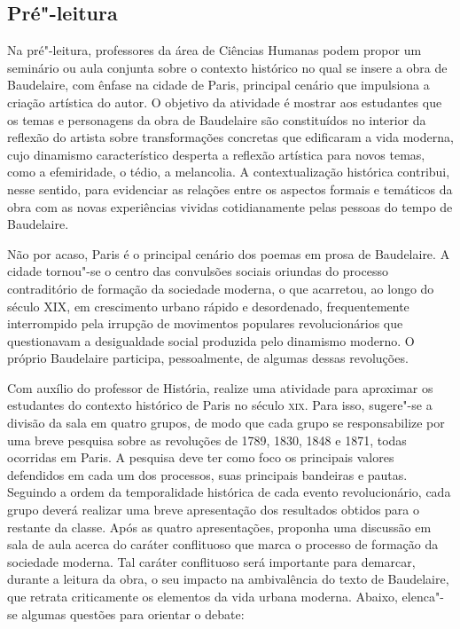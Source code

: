 \documentclass[12pt]{extarticle}
\begin{document}
\subsection{Pré"-leitura}

Na pré"-leitura, professores da área de Ciências Humanas
podem propor um seminário ou aula conjunta sobre o contexto histórico no qual se insere
a obra de Baudelaire, com ênfase na cidade de Paris, principal cenário que impulsiona a criação artística do autor. 
O objetivo da atividade é mostrar aos estudantes que os temas e personagens da obra de Baudelaire são constituídos no interior da reflexão do artista sobre transformações concretas que edificaram a vida moderna, cujo dinamismo característico desperta a reflexão artística para novos temas, como a efemiridade, o tédio, a melancolia. A contextualização histórica contribui, nesse sentido, para evidenciar as relações entre os aspectos formais e temáticos da obra com as novas experiências vividas cotidianamente pelas pessoas do tempo de Baudelaire.

Não por acaso, Paris é o principal cenário dos poemas em prosa de Baudelaire. A cidade tornou"-se o centro das convulsões sociais oriundas do processo contraditório de formação da sociedade moderna, o que acarretou, ao longo do século XIX, em crescimento urbano rápido e desordenado, frequentemente interrompido pela irrupção de movimentos populares revolucionários que questionavam a desigualdade social produzida pelo dinamismo moderno. O próprio Baudelaire participa, pessoalmente, de algumas dessas revoluções.


Com auxílio do professor de História, realize uma atividade para aproximar os estudantes do contexto histórico de Paris no século \textsc{xix}. Para isso, sugere"-se a divisão da sala em quatro grupos, de modo que cada grupo se responsabilize por uma breve pesquisa sobre as revoluções de 1789, 1830, 1848 e 1871, todas ocorridas em Paris. A pesquisa deve ter como foco os principais valores defendidos em cada um dos processos, suas principais bandeiras e pautas. Seguindo a ordem da temporalidade histórica de cada evento revolucionário, cada grupo deverá realizar uma breve apresentação dos resultados obtidos para o restante da classe. Após as quatro apresentações, proponha uma discussão em sala de aula acerca do caráter conflituoso que marca o processo de formação da sociedade moderna. Tal caráter conflituoso será importante para demarcar, durante a leitura da obra, o seu impacto na ambivalência do texto de Baudelaire, que retrata criticamente os elementos da vida urbana moderna. Abaixo, elenca"-se algumas questões para orientar o debate:
\end{document}
